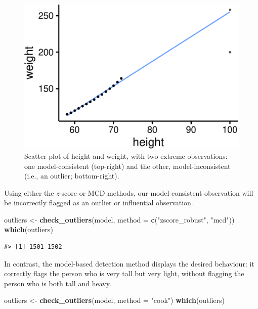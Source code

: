 \documentclass{article}
\newenvironment{Shaded}{\begin{snugshade}}{\end{snugshade}}
\newcommand{\AttributeTok}[1]{\textcolor[rgb]{0.13,0.29,0.53}{#1}}
\newcommand{\FunctionTok}[1]{\textcolor[rgb]{0.13,0.29,0.53}{\textbf{#1}}}
\newcommand{\NormalTok}[1]{#1}
\newcommand{\OtherTok}[1]{\textcolor[rgb]{0.56,0.35,0.01}{#1}}
\newcommand{\StringTok}[1]{\textcolor[rgb]{0.31,0.60,0.02}{#1}}
\begin{document}
\begin{figure}
\includegraphics[width=1\linewidth]{paper_files/figure-latex/scatter-1} \caption{Scatter plot of height and weight, with two extreme observations: one model-consistent (top-right) and the other, model-inconsistent (i.e., an outlier; bottom-right).}\label{fig:scatter}
\end{figure}

Using either the \emph{z}-score or MCD methods, our model-consistent
observation will be incorrectly flagged as an outlier or influential
observation.

\begin{Shaded}
\begin{Highlighting}[]
\NormalTok{outliers }\OtherTok{\textless{}{-}} \FunctionTok{check\_outliers}\NormalTok{(model, }\AttributeTok{method =} \FunctionTok{c}\NormalTok{(}\StringTok{"zscore\_robust"}\NormalTok{, }\StringTok{"mcd"}\NormalTok{))}
\FunctionTok{which}\NormalTok{(outliers)}
\end{Highlighting}
\end{Shaded}

\begin{verbatim}
#> [1] 1501 1502
\end{verbatim}

In contrast, the model-based detection method displays the desired
behaviour: it correctly flags the person who is very tall but very
light, without flagging the person who is both tall and heavy.

\begin{Shaded}
\begin{Highlighting}[]
\NormalTok{outliers }\OtherTok{\textless{}{-}} \FunctionTok{check\_outliers}\NormalTok{(model, }\AttributeTok{method =} \StringTok{"cook"}\NormalTok{)}
\FunctionTok{which}\NormalTok{(outliers)}
\end{Highlighting}
\end{Shaded}
\end{document}
